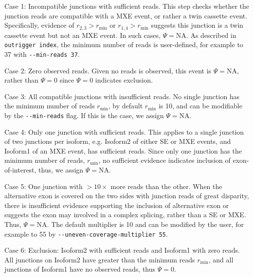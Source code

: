 \clearpage

\begin{longdescription}
	\item[Case 1: Incompatible junctions with sufficient reads.] This step checks whether the junction reads are compatible with a MXE event, or rather a twin cassette event. Specifically, evidence of  $r_{2,3} > r_{\min}$ or $r_{1,4} > r_{\min}$ suggests this junction is a twin cassette event but not an MXE event. In such cases, $\Psi = \text{NA}$. As described in \texttt{outrigger index}, the minimum number of reads is user-defined, for example to 37 with \texttt{-{}-min-reads~37}.
	\item[Case 2: Zero observed reads.] Given no reads is observed, this event is $\Psi = \text{NA}$, rather than $\Psi=0$ since $\Psi=0$ indicates exclusion.
	\item[Case 3: All compatible junctions with insufficient reads.] No single junction has the minimum number of reads $r_{\min}$, by default $r_{\min}$ is 10, and can be modifiable by the \texttt{-{}-min-reads} flag. If this is the case, we assign $\Psi = \text{NA}$.
	\item[Case 4: Only one junction with sufficient reads.] This applies to a single junction of two junctions per isoform, e.g. Isoform2 of either SE or MXE events, and Isoform1 of an MXE event, has sufficient reads. Since only one junction has the minimum number of reads, $r_{\min}$, no sufficient evidence indicates inclusion of exon-of-interest, thus, we assign $\Psi = \text{NA}$.
	\item[Case 5: One junction with $>10\times$ more reads than the other.] When the alternative exon is covered on the two sides with junction reads of great disparity, there is insufficient evidence supporting the inclusion of alternative exon or suggests the exon may involved in a complex splicing, rather than a SE or MXE. Thus, $\Psi = \text{NA}$. The default multiplier is 10 and can be modified by the user, for example to 55 by \texttt{-{}-uneven-coverage-multiplier~55}.
	\item[Case 6: Exclusion: Isoform2 with sufficient reads and Isoform1 with zero reads.] All junctions on Isoform2 have greater than the minimum reads $r_{\min}$, and all junctions of Isoform1 have no observed reads, thus $\Psi = 0$.

\end{longdescription}
